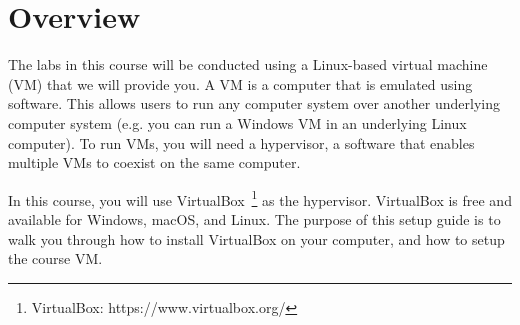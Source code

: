 \documentclass[11pt]{article}
\begin{document}
\maketitle \thispagestyle{fancy}



\section{Overview}
\label{sec:overview}
The labs in this course will be conducted using a Linux-based virtual machine (VM) that we will provide you. A VM is a computer that is emulated using software. This allows users to run any computer system over another underlying computer system (e.g. you can run a Windows VM in an underlying Linux computer). To run VMs, you will need a hypervisor, a software that enables multiple VMs to coexist on the same computer.

In this course, you will use VirtualBox~\footnote{VirtualBox: https://www.virtualbox.org/} as the hypervisor. VirtualBox is free and available for Windows, macOS, and Linux. The purpose of this setup guide is to walk you through how to install VirtualBox on your computer, and how to setup the course VM.





\end{document}

